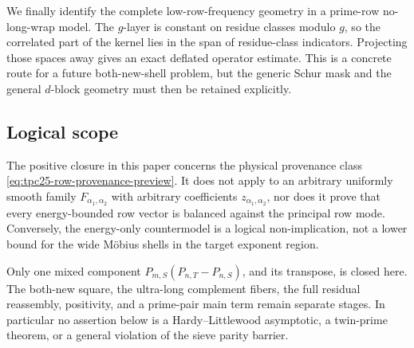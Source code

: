 We finally identify the complete low-row-frequency geometry in a
prime-row no-long-wrap model.  The \(g\)-layer is constant on residue
classes modulo \(g\), so the correlated part of the kernel lies in the
span of residue-class indicators.  Projecting those spaces away gives
an exact deflated operator estimate.  This is a concrete route for a
future both-new-shell problem, but the generic Schur mask and the
general \(d\)-block geometry must then be retained explicitly.

\subsection{Logical scope}

The positive closure in this paper concerns the physical provenance
class \eqref{eq:tpc25-row-provenance-preview}.  It does not apply to an
arbitrary uniformly smooth family \(F_{\alpha_1,\alpha_2}\) with
arbitrary coefficients \(z_{\alpha_1,\alpha_2}\), nor does it prove
that every energy-bounded row vector is balanced against the principal
row mode.  Conversely, the energy-only countermodel is a logical
non-implication, not a lower bound for the wide M\"obius shells in the
target exponent region.

Only one mixed component
\(P_{m,S}(P_{n,T}-P_{n,S})\), and its transpose, is closed here.  The
both-new square, the ultra-long complement fibers, the full residual
reassembly, positivity, and a prime-pair main term remain separate
stages.  In particular no assertion below is a Hardy--Littlewood
asymptotic, a twin-prime theorem, or a general violation of the sieve
parity barrier.
